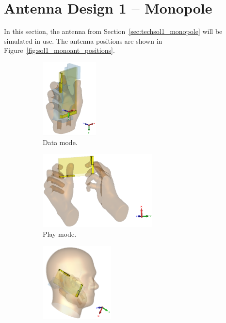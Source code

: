 
\section{Antenna Design 1 -- Monopole}
In this section, the antenna from Section~\ref{sec:techsol1_monopole} will be simulated in use. The antenna positions are shown in Figure~\ref{fig:sol1_monoant_positions}.


\begin{figure}[htbp]
    \centering
    \begin{subfigure}[b]{0.24\linewidth}
        \centering \includegraphics[width=\linewidth,height=4cm,keepaspectratio]{img/tech_sol/monopole/data_mode/3d_data_mode.PNG}
        \caption{Data mode.}
    \end{subfigure}
    \begin{subfigure}[b]{0.24\linewidth}
        \centering \includegraphics[width=\linewidth,height=4cm,keepaspectratio]{img/tech_sol/monopole/play_mode/3d_play_mode.PNG}
        \caption{Play mode.}
    \end{subfigure}
    \begin{subfigure}[b]{0.24\linewidth}
        \centering \includegraphics[width=\linewidth,height=4cm,keepaspectratio]{img/tech_sol/monopole/talk_mode/3d_talk_mode.PNG}

\end{subfigure}
\end{figure}
